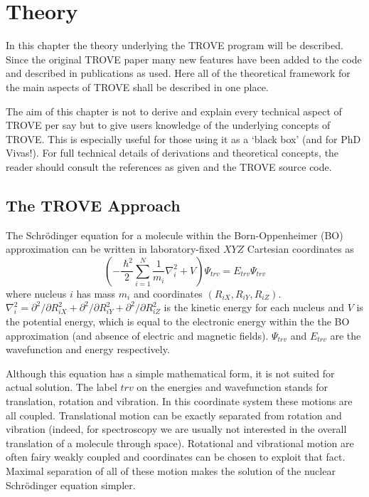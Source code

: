 
\chapter{Theory}
\label{chap:theory}

In this chapter the theory underlying the TROVE program will be described. Since the original TROVE paper many new 
features have been added to the code and described in publications as used. Here all of the theoretical framework 
for the main aspects of TROVE shall be described in one place. 

The aim of this chapter is not to derive and explain every technical aspect of TROVE per say but to give users knowledge of the
underlying concepts of TROVE. This is especially useful for those using it as a `black box' (and for PhD Vivas!). For full
technical details of derivations and theoretical concepts, the reader should consult the references as given and the 
TROVE source code.

\section{The TROVE Approach}
The Schr\"{o}dinger equation for a molecule within the Born-Oppenheimer (BO) approximation can be written in laboratory-fixed 
$XYZ$ Cartesian coordinates as 
\begin{equation}
\label{eq.schrodiger_lab_cart}
\left(-\frac{\ \hbar^2}{2} \sum_{i=1}^N \frac{1}{m_i} \nabla^2_i + V \right) \Psi_{trv} = E_{trv} \Psi_{trv}
\end{equation}
where nucleus $i$ has mass $m_i$ and coordinates $(R_{iX},R_{iY},R_{iZ})$. $\nabla^2_i = \partial ^2 / \partial R_{iX}^2 +
\partial ^2 / \partial R_{iY}^2  + \partial ^2 / \partial R_{iZ}^2$ is the kinetic energy for each nucleus and $V$ is the 
potential energy, which is equal to the electronic energy within the the BO approximation (and absence of electric and 
magnetic fields). $\Psi_{trv}$ and $E_{trv}$ are the wavefunction and energy respectively. 

Although this equation has a simple mathematical form, it is not suited for actual solution. The label $trv$ on the energies
and wavefunction stands for translation, rotation and vibration. In this coordinate system these motions are all coupled. 
Translational motion can be exactly separated from rotation and vibration (indeed, for spectroscopy we are usually not 
interested in the overall translation of a molecule through space). Rotational and vibrational motion are often fairy 
weakly coupled and coordinates can be chosen to exploit that fact. Maximal separation of all of these motion makes the 
solution of the nuclear Schr\"{o}dinger equation simpler.

